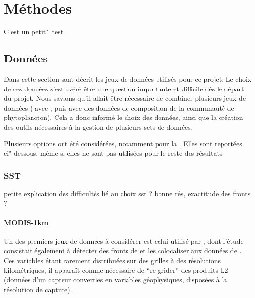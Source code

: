 \documentclass[index]{subfiles}
\begin{document}
\chapter{Méthodes}
\label{chp:methodes}

\tocsubfile

C'est un petit"~test.

\section{Données}
\label{sec:donnees}

Dans cette section sont décrit les jeux de données utilisés pour ce projet.
Le choix de ces données s'est avéré être une question importante et difficile dès le départ du projet.
Nous savions qu'il allait être nécessaire de combiner plusieurs jeux de données ( avec , puis avec des données de composition de la communauté de phytoplancton).
Cela a donc informé le choix des données, ainsi que la création des outils nécessaires à la gestion de plusieurs sets de données.

Plusieurs options ont été considérées, notamment pour la .
Elles sont reportées ci"-dessous, même si elles ne sont pas utilisées pour le reste des résultats.

\subsection{SST}
\label{sec:donnees-sst}

petite explication des difficultés lié au choix sst ?
bonne rés, exactitude des fronts ?

\subsubsection{MODIS-1km}
\label{sec:donnees-sst-modis}

Un des premiers jeux de données  à considérer est celui utilisé par \textcite{liu_2016}, dont l'étude consistait également à détecter des fronts de  et les colocaliser aux données de .
Ces variables étant rarement distribuées sur des grilles à des résolutions kilométriques, il apparaît comme nécessaire de \enquote{re-grider} des produits L2 (données d'un capteur converties en variables géophysiques, disposées à la résolution de capture).
\end{document}
